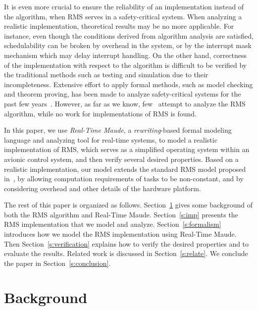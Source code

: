 \documentclass[10pt,journal]{IEEEtran}
\begin{document}
It is even more crucial to ensure the reliability of an implementation
instead of the algorithm, when RMS serves in a safety-critical
system. When analyzing a realistic implementation, theoretical results
may be no more applicable. For instance, even though the conditions
derived from algorithm analysis are satisfied, schedulability can be
broken by overhead in the system, or by the interrupt mask mechanism
which may delay interrupt handling. On the other hand, correctness of
the implementation with respect to the algorithm is difficult to be
verified by the traditional methods such as testing and simulation due
to their incompleteness. Extensive effort to apply formal methods,
such as model checking and theorem proving, has been made to analyze
safety-critical systems for the past few
years~\cite{DBLP:journals/tie/MiyawakiMSYV05,DBLP:journals/iandc/MeseguerR13,DBLP:journals/cacm/Leroy09,DBLP:conf/sosp/KleinEHACDEEKNSTW09}. However,
as far as we know, few~\cite{DBLP:conf/iceccs/CuiDT14,TianD2011}
attempt to analyze the RMS algorithm, while no work for
implementations of RMS is found.

In this paper, we use \emph{Real-Time Maude}, a \emph{rewriting}-based
formal modeling language and analyzing tool for real-time systems, to
model a realistic implementation of RMS, which serves as a simplified
operating system within an avionic control system, and then verify
several desired properties. Based on a realistic implementation, our
model extends the standard RMS model proposed
in~\cite{DBLP:journals/jacm/LiuL73}, by allowing computation
requirements of tasks to be non-constant, and by considering overhead
and other details of the hardware platform.

The rest of this paper is organized as
follows. Section~\ref{s:background} gives some background of both the
RMS algorithm and Real-Time Maude.  Section~\ref{s:imp} presents the
RMS implementation that we model and analyze.
Section~\ref{s:formalism} introduces how we model the RMS
implementation using Real-Time Maude. Then
Section~\ref{s:verification} explains how to verify the desired
properties and to evaluate the results. Related work is discussed in
Section~\ref{s:relate}. We conclude the paper in
Section~\ref{s:conclusion}.

\section{Background}
\label{s:background}
\end{document}
